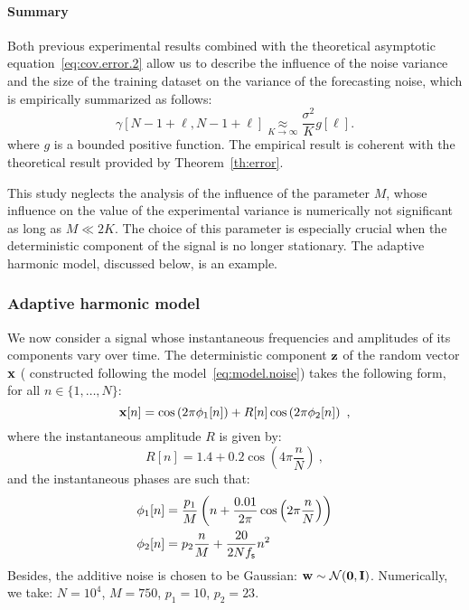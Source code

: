 \paragraph{Summary}
Both previous experimental results combined with the theoretical asymptotic equation~\eqref{eq:cov.error.2} allow us to describe the influence of the noise variance and the size of the training dataset on the variance of the forecasting noise, which is empirically summarized as follows:
\begin{equation}
\gamma[N-1+\ell,N-1+\ell] \underset{K\to\infty}{\approx} \dfrac{\sigma^2}{K}g[\ell] .
\end{equation} 
where $g$ is a bounded positive function. The empirical result is coherent with the theoretical result provided by Theorem~\ref{th:error}.

This study neglects the analysis of the influence of the parameter $M$, whose influence on the value of the experimental variance is numerically not significant as long as $M\ll 2K$. The choice of this parameter is especially crucial when the deterministic component of the signal is no longer stationary. The adaptive harmonic model, discussed below, is an example.

\subsubsection{Adaptive harmonic model}
\label{ssse:res.ahm}
We now consider a signal whose instantaneous frequencies and amplitudes of its components vary over time. The deterministic component ${\mathbf z}$ of the random vector ${\mathbf x}$ ( constructed following the model~\eqref{eq:model.noise}) takes the following form, for all $n\in\{1,\ldots,N\}$:
\[
{\mathbf x}[n] = \cos\left(2\pi \phi_1[n] \right) + R[n]\cos\left(2\pi \phi_2[n] \right) \ ,
\] 
where the instantaneous amplitude $R$ is given by:
\[
R[n] = 1.4 + 0.2\cos\left(4\pi\frac{n}{N}\right)\ ,
\]
and the instantaneous phases are such that:
\begin{align*}
\phi_1[n] &= \frac{p_1}{M}\left( n + \frac{0.01}{2\pi}\cos\left(2\pi\frac{n}{N}\right) \right) \\
\phi_2[n] & = p_2\frac{n}{M} + \frac{20}{2Nf_{\mathsf s}}n^2
\end{align*}
Besides, the additive noise is chosen to be Gaussian: ${\mathbf w}\sim{\mathcal N}(\boldsymbol{0},{\mathbf I})$. Numerically, we take: $N=10^4$, $M=750$, $p_1=10$, $p_2=23$.

